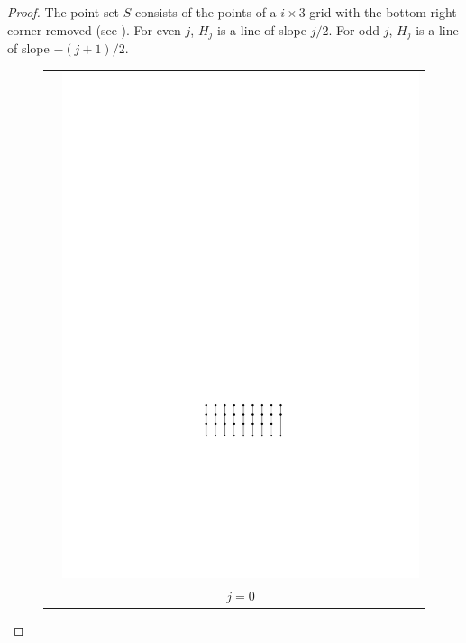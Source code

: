 \documentclass{patmorin}
\begin{document}
\begin{proof}
The point set $S$ consists of the points of a $i\times 3$ grid with the bottom-right corner removed (see ).  For even $j$, $H_j$ is a line of slope $j/2$.  For odd $j$, $H_j$ is a line of slope $-(j+1)/2$.
\begin{figure}
  \begin{center} 
    \begin{tabular}{cc}
      & \includegraphics{j0} \\ 
      & $j = 0$  \\

\end{tabular}
\end{center}
\end{figure}
\end{proof}
\end{document}
